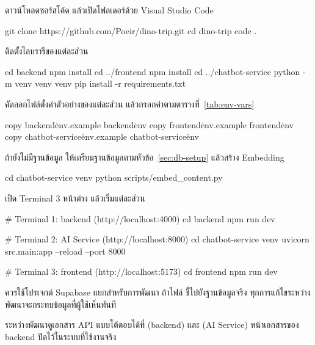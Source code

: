 \begin{steps}
  \item ดาวน์โหลดซอร์สโค้ด แล้วเปิดโฟลเดอร์ด้วย Visual Studio Code
\begin{terminal}
git clone https://github.com/Poeir/dino-trip.git
cd dino-trip
code .
\end{terminal}
  \item ติดตั้งไลบรารีของแต่ละส่วน
\begin{terminal}
cd backend
npm install
cd ../frontend
npm install
cd ../chatbot-service
python -m venv venv
venv\Scripts\activate
pip install -r requirements.txt
\end{terminal}
  \item คัดลอกไฟล์ตั้งค่าตัวอย่างของแต่ละส่วน แล้วกรอกค่าตามตารางที่~\ref{tab:env-vars}
\begin{terminal}
copy backend\.env.example backend\.env
copy frontend\.env.example frontend\.env
copy chatbot-service\.env.example chatbot-service\.env
\end{terminal}
  \item ถ้ายังไม่มีฐานข้อมูล ให้เตรียมฐานข้อมูลตามหัวข้อ~\ref{sec:db-setup} แล้วสร้าง Embedding
\begin{terminal}
cd chatbot-service
venv\Scripts\activate
python scripts/embed_content.py
\end{terminal}
  \item เปิด Terminal 3 หน้าต่าง แล้วเริ่มแต่ละส่วน
\begin{terminal}
# Terminal 1: backend (http://localhost:4000)
cd backend
npm run dev

# Terminal 2: AI Service (http://localhost:8000)
cd chatbot-service
venv\Scripts\activate
uvicorn src.main:app --reload --port 8000

# Terminal 3: frontend (http://localhost:5173)
cd frontend
npm run dev
\end{terminal}
\end{steps}

\begin{warning}
ควรใช้โปรเจกต์ Supabase แยกสำหรับการพัฒนา ถ้าไฟล์  ชี้ไปยังฐานข้อมูลจริง ทุกการแก้ไขระหว่างพัฒนาจะกระทบข้อมูลที่ผู้ใช้เห็นทันที
\end{warning}

ระหว่างพัฒนาดูเอกสาร API แบบโต้ตอบได้ที่  (backend) และ  (AI Service) หน้าเอกสารของ backend ปิดไว้ในระบบที่ใช้งานจริง

